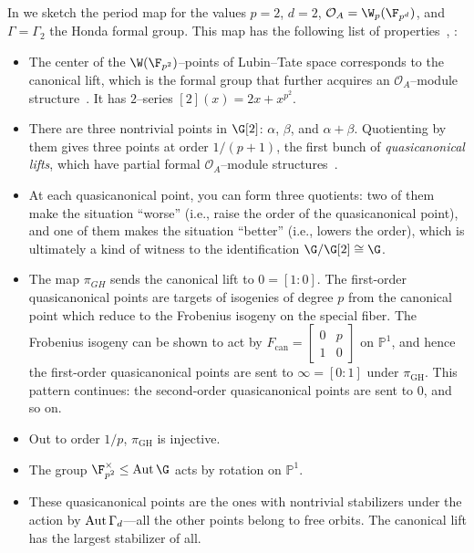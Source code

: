 \begin{remark}
In  we sketch the period map for the values \(p = 2\), \(d = 2\), \(\sheaf O_A = \W_p(\F_{p^d})\), and \(\Gamma = \Gamma_2\) the Honda formal group.
This map has the following list of properties~\cite[Appendix 25]{HopkinsGrossEquivVBs}, \cite{Yu}:
\begin{itemize}
\item The center of the \(\W(\F_{p^2})\)--points of Lubin--Tate space corresponds to the canonical lift, which is the formal group that further acquires an \(\mathcal O_A\)--module structure~\cite{LubinTateOther}.
      It has \(2\)--series \([2](x) = 2 x + x^{p^2}\).
\item There are three nontrivial points in \(\G[2]\): \(\alpha\), \(\beta\), and \(\alpha + \beta\).
      Quotienting by them gives three points at order \(1/(p+1)\), the first bunch of \textit{quasicanonical lifts}, which have partial formal \(\mathcal O_A\)--module structures~\cite{Gross}.
\item At each quasicanonical point, you can form three quotients: two of them make the situation ``worse'' (i.e., raise the order of the quasicanonical point), and one of them makes the situation ``better'' (i.e., lowers the order), which is ultimately a kind of witness to the identification \(\G / \G[2] \cong \G\).
\item The map \(\pi_{GH}\) sends the canonical lift to \(0 = [1:0]\).
      The first-order quasicanonical points are targets of isogenies of degree \(p\) from the canonical point which reduce to the Frobenius isogeny on the special fiber.
      The Frobenius isogeny can be shown to act by \(F_{\mathrm{can}} = \left[ \begin{array}{cc} 0 & p \\ 1 & 0 \end{array} \right]\) on \(\mathbb P^1\), and hence the first-order quasicanonical points are sent to \(\infty = [0:1]\) under \(\pi_{\mathrm{GH}}\).
      This pattern continues: the second-order quasicanonical points are sent to \(0\), and so on.
\item Out to order \(1/p\), \(\pi_{\mathrm{GH}}\) is injective.
\item The group \(\F_{p^2}^\times \le \Aut \G\) acts by rotation on \(\mathbb P^1\).
\item These quasicanonical points are the ones with nontrivial stabilizers under the action by \(\operatorname{Aut} \Gamma_d\)---all the other points belong to free orbits.
      The canonical lift has the largest stabilizer of all.
\end{itemize}
\end{remark}

